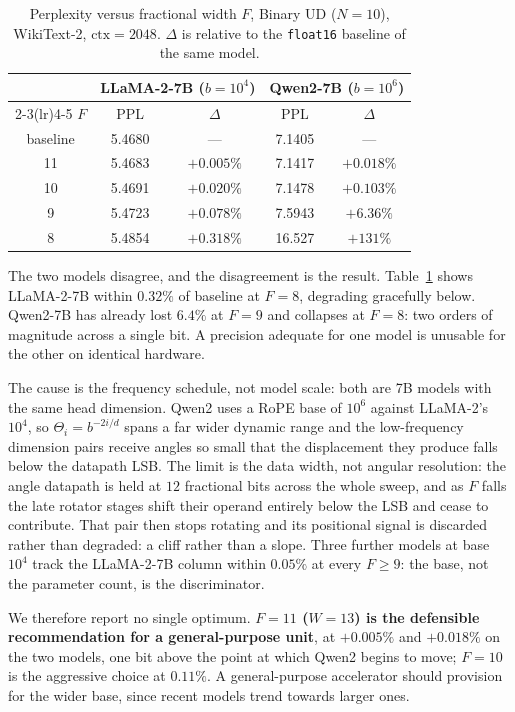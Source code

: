 \documentclass[conference]{IEEEtran}
\begin{document}
\begin{table}[t]
\caption{Perplexity versus fractional width $F$, Binary UD ($N=10$),
WikiText-2, $\mathrm{ctx}=2048$. $\Delta$ is relative to the
\texttt{float16} baseline of the same model.}
\label{tab:fsweep}
\centering
\begin{tabular}{ccccc}
\toprule
& \multicolumn{2}{c}{LLaMA-2-7B ($b{=}10^{4}$)} & \multicolumn{2}{c}{Qwen2-7B ($b{=}10^{6}$)} \\
\cmidrule(lr){2-3}\cmidrule(lr){4-5}
$F$ & PPL & $\Delta$ & PPL & $\Delta$ \\
\midrule
baseline & 5.4680 & ---        & 7.1405 & --- \\
11       & 5.4683 & $+0.005\%$ & 7.1417 & $+0.018\%$ \\
10       & 5.4691 & $+0.020\%$ & 7.1478 & $+0.103\%$ \\
9        & 5.4723 & $+0.078\%$ & 7.5943 & $+6.36\%$ \\
8        & 5.4854 & $+0.318\%$ & 16.527 & $+131\%$ \\
\bottomrule
\end{tabular}
\end{table}

The two models disagree, and the disagreement is the result.
Table~\ref{tab:fsweep} shows LLaMA-2-7B within $0.32\%$ of baseline at $F=8$,
degrading gracefully below. Qwen2-7B has already lost $6.4\%$ at $F=9$ and
collapses at $F=8$: two orders of magnitude across a single bit. A precision
adequate for one model is unusable for the other on identical hardware.

The cause is the frequency schedule, not model scale: both are 7B models with
the same head dimension. Qwen2 uses a RoPE base of $10^{6}$ against LLaMA-2's
$10^{4}$, so $\Theta_i = b^{-2i/d}$ spans a far wider dynamic range and the
low-frequency dimension pairs receive angles so small that the displacement
they produce falls below the datapath LSB. The limit is the data width, not
angular resolution: the angle datapath is held at $12$ fractional bits across
the whole sweep, and as $F$ falls the late rotator stages shift their operand
entirely below the LSB and cease to contribute. That pair then stops rotating
and its positional signal is discarded rather than degraded: a cliff rather
than a slope. Three further models at base $10^{4}$ track the LLaMA-2-7B column
within $0.05\%$ at every $F \ge 9$: the base, not the parameter count, is the
discriminator.

We therefore report no single optimum. \textbf{$F=11$ ($W=13$) is the
defensible recommendation for a general-purpose unit}, at $+0.005\%$ and
$+0.018\%$ on the two models, one bit above the point at which Qwen2 begins to
move; $F=10$ is the aggressive choice at $0.11\%$. A general-purpose
accelerator should provision for the wider base, since recent models trend
towards larger ones.
\end{document}
